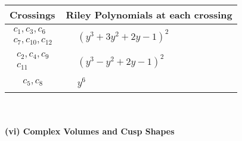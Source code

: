 \documentclass[1p]{elsarticle_modified}
\theoremstyle{definition}
\begin{document}
\begin{tabular}{m{50pt}|m{274pt}}
Crossings & \hspace{64pt}Riley Polynomials at each crossing \\
\hline $$\begin{aligned}c_{1},c_{3},c_{6}\\c_{7},c_{10},c_{12}\end{aligned}$$&$\begin{aligned}
&(y^3+3 y^2+2 y-1)^2
\end{aligned}$\\
\hline $$\begin{aligned}c_{2},c_{4},c_{9}\\c_{11}\end{aligned}$$&$\begin{aligned}
&(y^3- y^2+2 y-1)^2
\end{aligned}$\\
\hline $$\begin{aligned}c_{5},c_{8}\end{aligned}$$&$\begin{aligned}
&y^6
\end{aligned}$\\
\hline
\end{tabular}\\~\\
\newpage\flushleft \textbf{(vi) Complex Volumes and Cusp Shapes}
\end{document}
